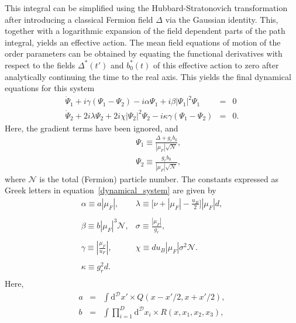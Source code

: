 \documentclass[a4paper,10pt]{report}
\begin{document}
This integral can be simplified using the Hubbard-Stratonovich transformation after introducing a classical Fermion field $\Delta$ via the Gaussian identity. This, together with a logarithmic expansion of the field dependent parts of the path integral, yields an effective action.
The mean field equations of motion of the order parameters can be obtained by equating the functional derivatives with respect to the fields 
$\Delta^*(t')$ and $b^*_0(t)$ of this effective action to zero after analytically continuing the time to the real axis. This yields the final dynamical equations for this system
\begin{eqnarray}
\label{dynamical_system}
\dot \Psi_1 + i\gamma \left( \Psi_1-\Psi_2 \right) - i\alpha \Psi_1 +i\beta |\Psi_1|^2 \Psi_1 &=& 0 \nonumber \\
\dot \Psi_2 +2 i \lambda \Psi_2 +2 i\chi|\Psi_2|^2\Psi_2 - i\kappa\gamma \left(\Psi_1-\Psi_2 \right) &=& 0.
\end{eqnarray}
Here, the gradient terms have been ignored, and
\begin{eqnarray}
\label{vartrans}
&&{\Psi}_1 \equiv \frac{\Delta + g_rb_0}{|\mu_F|\sqrt{\mathcal N}}, \nonumber \\
&&{\Psi}_2 \equiv \frac{g_rb_0}{|\mu_F|\sqrt{\mathcal N}},
\end{eqnarray}
where $\mathcal{N}$ is the total (Fermion) particle number. The constants expressed as Greek letters in equation~\ref{dynamical_system} are given by
\begin{equation}
\label{greek_consts}
\begin{array}{ll}
 \alpha\equiv  a|\mu_F|,		&\lambda \equiv \bigg[\nu+|\mu_F|-\frac{u_B}{2} \bigg]|\mu_F|d,  \\
					&					  			 \\
\beta\equiv  b|\mu_F|^3{\mathcal N},    &\sigma \equiv   \frac{|\mu_F|}{g_r},			  	 \\
					&					  			 \\
\gamma\equiv  |\frac{\mu_F}{u_F}|, 	&\chi\equiv  d u_B|\mu_F|\sigma^2{\mathcal N}.			 \\
					&					  			 \\
\kappa  \equiv  g^2_rd.  		& 						  		 \\
\end{array}
\end{equation}
Here,
\begin{eqnarray}
\label{abc}
a&=& \int{\mathrm d}^{\mathcal{D}}x'\times Q(x-x'/2,x+x'/2),\nonumber\\
b&=&\int{\prod_{i=1}^D{\mathrm d}^{\mathcal{D}}x_i} \times R(x,x_1,x_2,x_3),
\end{eqnarray}
\end{document}
